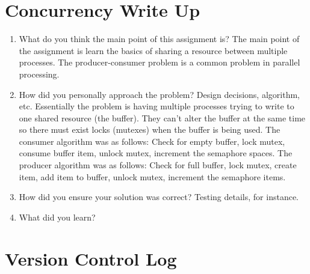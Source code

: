 \documentclass[letterpaper,10pt,draftclsnofoot,onecolumn,titlepage]{IEEEtran}
\begin{document}
\section{Concurrency Write Up}
\begin{enumerate}  
		\item What do you think the main point of this assignment is?
		   The main point of the assignment is learn the basics of sharing a resource between multiple processes. The producer-consumer problem is a common problem in parallel processing.
		\item How did you personally approach the problem? Design decisions, algorithm, etc.
		   Essentially the problem is having multiple processes trying to write to one shared resource (the buffer). They can't alter the buffer at the same time so there must exist locks (mutexes) when the buffer is being used.
		   The consumer algorithm was as follows: Check for empty buffer, lock mutex, consume buffer item, unlock mutex, increment the semaphore spaces.
		   The producer algorithm was as follows: Check for full buffer, lock mutex, create item, add item to buffer, unlock mutex, increment the semaphore items. 
		\item How did you ensure your solution was correct? Testing details, for instance.
		\item What did you learn?
 	\end{enumerate}
    
\section{Version Control Log}
\end{document}
